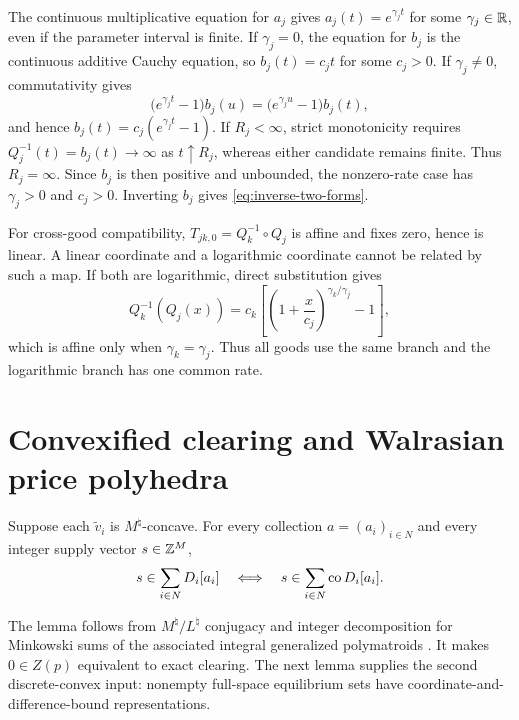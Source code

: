 The continuous multiplicative equation for $a_j$ gives $a_j(t)=e^{\gamma_jt}$ for some $\gamma_j\in\mathbb{R}$, even if the parameter interval is finite. If $\gamma_j=0$, the equation for $b_j$ is the continuous additive Cauchy equation, so $b_j(t)=c_jt$ for some $c_j>0$. If $\gamma_j\ne0$, commutativity gives
\[
\bigl(e^{\gamma_jt}-1\bigr)b_j(u)
=\bigl(e^{\gamma_ju}-1\bigr)b_j(t),
\]
and hence $b_j(t)=c_j(e^{\gamma_jt}-1)$. If $R_j<\infty$, strict monotonicity requires $Q_j^{-1}(t)=b_j(t)\to\infty$ as $t\uparrow R_j$, whereas either candidate remains finite. Thus $R_j=\infty$. Since $b_j$ is then positive and unbounded, the nonzero-rate case has $\gamma_j>0$ and $c_j>0$. Inverting $b_j$ gives \eqref{eq:inverse-two-forms}.

For cross-good compatibility, $T_{jk,0}=Q_k^{-1}\circ Q_j$ is affine and fixes zero, hence is linear. A linear coordinate and a logarithmic coordinate cannot be related by such a map. If both are logarithmic, direct substitution gives
\[
Q_k^{-1}(Q_j(x))
=c_k\left[\left(1+\frac{x}{c_j}\right)^{\gamma_k/\gamma_j}-1\right],
\]
which is affine only when $\gamma_k=\gamma_j$. Thus all goods use the same branch and the logarithmic branch has one common rate.

\section{Convexified clearing and Walrasian price polyhedra}\label{app:walrasian}

\begin{lemma}\label{lem:convexified-clearing}
Suppose each $\widetilde v_i$ is $M^\natural$-concave. For every collection $a=(a_i)_{i\in N}$ and every integer supply vector $s\in\mathbb{Z}^M$,
\[
s\in\sum_{i\in N}D_i[a_i]
\quad\Longleftrightarrow\quad
s\in\sum_{i\in N}\operatorname{co} D_i[a_i].
\]
\end{lemma}

The lemma follows from $M^\natural/L^\natural$ conjugacy \citep[Theorem~4.5]{murota2016} and integer decomposition for Minkowski sums of the associated integral generalized polymatroids \citep[equation~(3.1), Theorem~3.1, and Example~3.1]{murotatamura2024}. It makes $0\in Z(p)$ equivalent to exact clearing. The next lemma supplies the second discrete-convex input: nonempty full-space equilibrium sets have coordinate-and-difference-bound representations.

